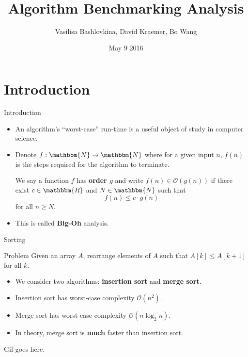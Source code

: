 \documentclass[]{beamer}
\title[MAT 336 Final Project]{Algorithm Benchmarking Analysis}
\author{Vasilisa Bashlovkina, David Kraemer, Bo Wang}
\date{May 9 2016}
\renewcommand{\emph}{\textbf}
\newcommand{\N}{\mathbbm{N}}
\newcommand{\R}{\mathbbm{R}}
\newcommand{\Order}{\mathcal{O}}
\begin{document}
\begin{frame}
\titlepage
\end{frame}

\section{Introduction}


\begin{frame}[t]{Introduction}

\begin{itemize}
	\item An algorithm's ``worst-case'' run-time is a useful object of study in computer science.
    \item Denote $f : \N \to \N$ where for a given input $n$, $f(n)$ is the steps required for the algorithm to terminate.
    \begin{definition}
	We say a function $f$ has \emph{order $g$} and write $f(n) \in \Order(g(n))$ if there exist $c \in \R$ and $N \in \N$ such that
    \[
    f(n) \leq c \cdot g(n)
    \]
    for all $n \geq N$. 
	\end{definition}
    \item This is called \emph{Big-Oh} analysis.
\end{itemize}
\end{frame}

\begin{frame}[t]{Sorting}
\begin{block}{Problem}
Given an array $A$, rearrange elements of $A$ such that $A[k] \leq A[k+1]$ for all $k$.
\end{block}
\begin{itemize}
	\item We consider two algorithms: \emph{insertion sort} and \emph{merge sort}.
    \item Insertion sort has worst-case complexity $\Order(n^2)$.
    \item Merge sort has worst-case complexity $\Order(n \log_2 n)$.
    \item In theory, merge sort is \emph{much} faster than insertion sort.
\end{itemize}
\end{frame}

\begin{frame}
\end{frame}

\begin{frame}
Gif goes here.
\end{frame}
\end{document}

